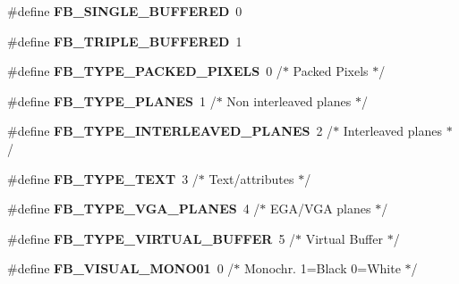\begin{DoxyCompactItemize}
\mbox{\label{group__libmisc__fb_ga070673b40d4378202b5c38658d10b067}} 
\#define {\bfseries F\+B\+\_\+\+S\+I\+N\+G\+L\+E\+\_\+\+B\+U\+F\+F\+E\+R\+ED}~0
\item 
\mbox{\label{group__libmisc__fb_ga4ae20fc1f57b1b86f936d4cb1623d152}} 
\#define {\bfseries F\+B\+\_\+\+T\+R\+I\+P\+L\+E\+\_\+\+B\+U\+F\+F\+E\+R\+ED}~1
\item 
\mbox{\label{group__libmisc__fb_gac8079fdf2dc52bb849a7d1df899b43ef}} 
\#define {\bfseries F\+B\+\_\+\+T\+Y\+P\+E\+\_\+\+P\+A\+C\+K\+E\+D\+\_\+\+P\+I\+X\+E\+LS}~0    /$\ast$ Packed Pixels    $\ast$/
\item 
\mbox{\label{group__libmisc__fb_gaee5aa77d219ac28d0f2bd578d95d442e}} 
\#define {\bfseries F\+B\+\_\+\+T\+Y\+P\+E\+\_\+\+P\+L\+A\+N\+ES}~1    /$\ast$ Non interleaved planes $\ast$/
\item 
\mbox{\label{group__libmisc__fb_ga6208fe449e45abac29264d7c8bf250b2}} 
\#define {\bfseries F\+B\+\_\+\+T\+Y\+P\+E\+\_\+\+I\+N\+T\+E\+R\+L\+E\+A\+V\+E\+D\+\_\+\+P\+L\+A\+N\+ES}~2    /$\ast$ Interleaved planes    $\ast$/
\item 
\mbox{\label{group__libmisc__fb_ga8e072ff2cb3afe96261ad964880db996}} 
\#define {\bfseries F\+B\+\_\+\+T\+Y\+P\+E\+\_\+\+T\+E\+XT}~3    /$\ast$ Text/attributes    $\ast$/
\item 
\mbox{\label{group__libmisc__fb_ga017caac8d1e1c7a62641c337f5249caa}} 
\#define {\bfseries F\+B\+\_\+\+T\+Y\+P\+E\+\_\+\+V\+G\+A\+\_\+\+P\+L\+A\+N\+ES}~4    /$\ast$ E\+GA/V\+GA planes    $\ast$/
\item 
\mbox{\label{group__libmisc__fb_ga09e2009c06429fdd5daf1822585ee2ec}} 
\#define {\bfseries F\+B\+\_\+\+T\+Y\+P\+E\+\_\+\+V\+I\+R\+T\+U\+A\+L\+\_\+\+B\+U\+F\+F\+ER}~5    /$\ast$ Virtual Buffer $\ast$/
\item 
\mbox{\label{group__libmisc__fb_ga48c03e34aaec22bb7d31126ad5366f2a}} 
\#define {\bfseries F\+B\+\_\+\+V\+I\+S\+U\+A\+L\+\_\+\+M\+O\+N\+O01}~0    /$\ast$ Monochr. 1=Black 0=White $\ast$/

\end{DoxyCompactItemize}
